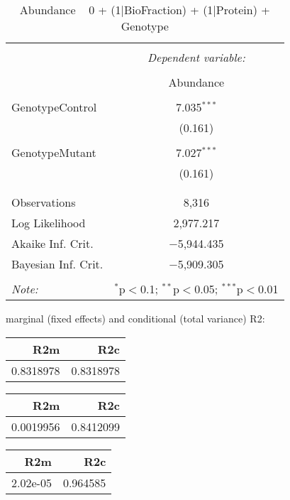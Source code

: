 \documentclass[11pt]{report}
\begin{document}
\begin{table}[!htbp] \centering 
  \caption{Abundance ~ 0 + (1|BioFraction) + (1|Protein) + Genotype} 
  \label{} 
\begin{tabular}{@{\extracolsep{5pt}}lc} 
\\[-1.8ex]\hline 
\hline \\[-1.8ex] 
 & \multicolumn{1}{c}{\textit{Dependent variable:}} \\ 
\cline{2-2} 
\\[-1.8ex] & Abundance \\ 
\hline \\[-1.8ex] 
 GenotypeControl & 7.035$^{***}$ \\ 
  & (0.161) \\ 
  & \\ 
 GenotypeMutant & 7.027$^{***}$ \\ 
  & (0.161) \\ 
  & \\ 
\hline \\[-1.8ex] 
Observations & 8,316 \\ 
Log Likelihood & 2,977.217 \\ 
Akaike Inf. Crit. & $-$5,944.435 \\ 
Bayesian Inf. Crit. & $-$5,909.305 \\ 
\hline 
\hline \\[-1.8ex] 
\textit{Note:}  & \multicolumn{1}{r}{$^{*}$p$<$0.1; $^{**}$p$<$0.05; $^{***}$p$<$0.01} \\ 
\end{tabular} 
\end{table} 
marginal (fixed effects) and conditional (total variance) R2:

\begin{tabular}{r|r}
\hline
R2m & R2c\\
\hline
0.8318978 & 0.8318978\\
\hline
\end{tabular}

\begin{tabular}{r|r}
\hline
R2m & R2c\\
\hline
0.0019956 & 0.8412099\\
\hline
\end{tabular}

\begin{tabular}{r|r}
\hline
R2m & R2c\\
\hline
2.02e-05 & 0.964585\\
\hline
\end{tabular}
\end{document}
